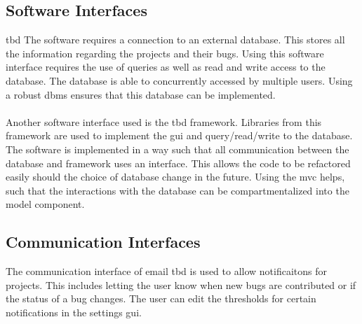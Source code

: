 \documentclass{article}
\newcommand{\comment}[1]{}
\begin{document}
\subsection{Software Interfaces}
\comment{
Describe the connections between this product and other specific software components (name and version) including databases, operating systems, tools, libraries, and integrated commercial components. Identify the data items or messages coming into the system and going out and describe the purpose of each. Describe the services needed and the nature of communications. Refer to documents that describe detailed application programmin interface protocols. Identify data that will be shared across software components. If the data sharing mechanisim must be implemented in a specific way (for example, use of a global data area in a multitasking operating system), specify this as an implementation constraint.
}
\acrshort{tbd}
The software requires a connection to an external \gls{database}. This stores all the information regarding the projects and their bugs. Using this software interface requires the use of queries as well as read and write access to the \gls{database}. The \gls{database} is able to concurrently accessed by multiple users. Using a robust \acrshort{dbms} ensures that this \gls{database} can be implemented.
\\ \\
Another software interface used is the \acrshort{tbd} framework. Libraries from this framework are used to implement the \acrshort{gui} and query/read/write to the \gls{database}. The software is implemented in a way such that all communication between the \gls{database} and framework uses an interface. This allows the code to be refactored easily should the choice of \gls{database} change in the future. Using the \acrshort{mvc} helps, such that the interactions with the \gls{database} can be compartmentalized into the model component.
\subsection{Communication Interfaces}
\comment{
	Describe the requirements associated with any communication functions required by this product, including e-mail, web-browswer, network server communication protocols, electronic forms, and so on. Define any pertinant message formatting. Identify any communication standards that will be used, such as FTP or HTTP. Specify any communication security or encryption issues, data transfer rates, and synchronization mechanisms.
}
The communication interface of email \acrshort{tbd} is used to allow notificaitons for projects. This includes letting the user know when new bugs are contributed or if the status of a bug changes. The user can edit the thresholds for certain notifications in the settings \acrshort{gui}.
\end{document}
